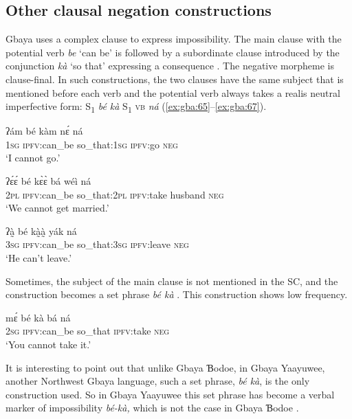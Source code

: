 \documentclass[output=paper,colorlinks=true, citecolor=brown]{langscibook}
\begin{document}
\subsection{Other clausal negation constructions}\label{sec:gba:2.6}

Gbaya uses a complex clause to express impossibility. The main clause with the potential verb \textit{be} ‘can be’ is followed by a subordinate clause introduced by the conjunction \textit{kà} ‘so that’ expressing a consequence . The negative morpheme is clause-final. In such constructions, the two clauses have the same subject that is mentioned before each verb and the potential verb always takes a realis neutral imperfective form: S\textsubscript{1} \textit{bé kà} S\textsubscript{1} \textsc{vb} \textit{ná} (\ref{ex:gba:65}--\ref{ex:gba:67}). 

\ea\label{ex:gba:65}
    \gll ʔám bé kàm nɛ́ ná \\ 
         1\textsc{sg} \textsc{ipfv}:can\_be so\_that:\textsc{1sg} \textsc{ipfv}:go \textsc{neg} \\
    \glt ‘I cannot go.’
\z 

\ea\label{ex:gba:66}
    \gll ʔɛ́ɛ́ bé kɛ̀ɛ̀ bá wéì ná \\ 
         2\textsc{pl} \textsc{ipfv}:can\_be so\_that:\textsc{2pl} \textsc{ipfv}:take husband \textsc{neg} \\
    \glt ‘We cannot get married.’
\z 

\ea\label{ex:gba:67}
    \gll  ʔà̰	bé	kà̰à̰	  yák	ná\\ 
         3\textsc{sg} \textsc{ipfv}:can\_be so\_that:\textsc{3sg} \textsc{ipfv}:leave \textsc{neg} \\
    \glt ‘He can’t leave.’
\z 

Sometimes, the subject of the main clause is not mentioned in the SC, and the construction becomes a set phrase \textit{bé kà} . This construction shows low frequency.


\ea\label{ex:gba:68}
    \gll mɛ́ bé kà bá ná \\ 
         2\textsc{sg} \textsc{ipfv}:can\_be so\_that \textsc{ipfv:}take \textsc{neg} \\
    \glt ‘You cannot take it.’
\z 

It is interesting to point out that unlike Gbaya \MakeUppercase{ɓ}odoe, in Gbaya Yaayuwee, another Northwest Gbaya language, such a set phrase, \textit{bé kà}, is the only construction used. So in Gbaya Yaayuwee this set phrase has become a verbal marker of impossibility \textit{bé{}-kà,} which is not the case in Gbaya \MakeUppercase{ɓ}odoe \citep[see][]{Noss1981}.
\end{document}
